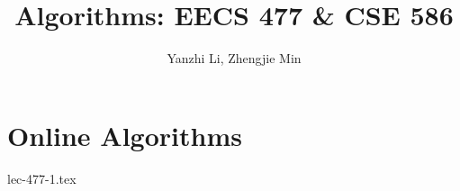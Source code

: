 \documentclass[a4paper]{report}
\author{Yanzhi Li, Zhengjie Min}
\title{Algorithms: EECS 477 \& CSE 586}
\begin{document}
\maketitle

\begin{abstract}
\end{abstract}

\newpage

\tableofcontents

\part{Online Algorithms}

{lec-477-1.tex}

\newpage
\appendix
\appendixpage{}

%

\newpage
\pagestyle{plain}
\printbibliography{}
\end{document}
